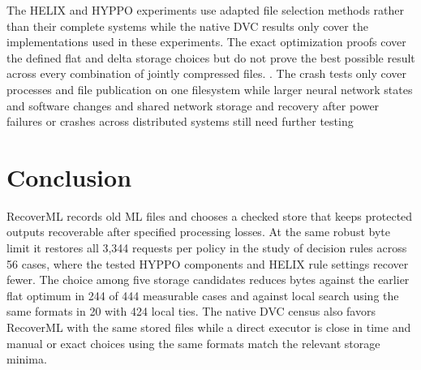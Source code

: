 The HELIX and HYPPO experiments use adapted file selection methods rather than their complete systems while the native DVC results only cover the implementations used in these experiments. The exact optimization proofs cover the defined flat and delta storage choices but do not prove the best possible result across every combination of jointly compressed files. . The crash tests only cover processes and file publication on one filesystem while larger neural network states and software changes and shared network storage and recovery after power failures or crashes across distributed systems still need further testing

\FloatBarrier
\section{Conclusion}

RecoverML records old ML files and chooses a checked store that keeps protected outputs recoverable after specified processing losses. At the same robust byte limit it restores all 3,344 requests per policy in the study of decision rules across 56 cases, where the tested HYPPO components and HELIX rule settings recover fewer. The choice among five storage candidates reduces bytes against the earlier flat optimum in 244 of 444 measurable cases and against local search using the same formats in 20 with 424 local ties. The native DVC census also favors RecoverML with the same stored files while a direct executor is close in time and manual or exact choices using the same formats match the relevant storage minima.

\balance




